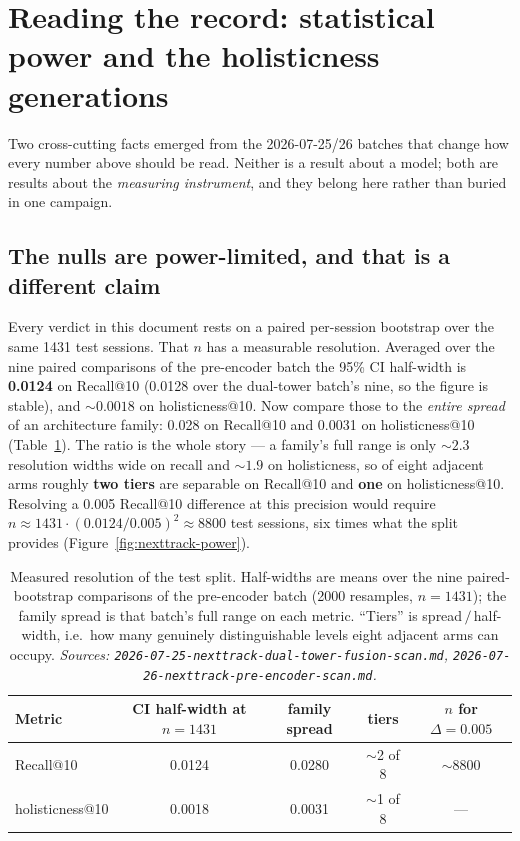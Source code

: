 \documentclass[11pt]{article}
\begin{document}
\section{Reading the record: statistical power and the holisticness generations}
\label{sec:power}
Two cross-cutting facts emerged from the 2026-07-25/26 batches that change how
every number above should be read. Neither is a result about a model; both are
results about the \emph{measuring instrument}, and they belong here rather than
buried in one campaign.

\subsection{The nulls are power-limited, and that is a different claim}
\label{sec:power-stats}
Every verdict in this document rests on a paired per-session bootstrap over the
same \num{1431} test sessions. That $n$ has a measurable resolution. Averaged
over the nine paired comparisons of the pre-encoder batch the 95\% CI half-width
is \textbf{\num{0.0124}} on Recall@10 (\num{0.0128} over the dual-tower batch's
nine, so the figure is stable), and \textbf{${\sim}\num{0.0018}$} on
holisticness@10. Now compare those to the \emph{entire spread} of an architecture
family: \num{0.028} on Recall@10 and \num{0.0031} on holisticness@10
(Table~\ref{tab:power}). The ratio is the whole story --- a family's full range
is only ${\sim}2.3$ resolution widths wide on recall and ${\sim}1.9$ on
holisticness, so of eight adjacent arms roughly \textbf{two tiers} are separable
on Recall@10 and \textbf{one} on holisticness@10. Resolving a \num{0.005}
Recall@10 difference at this precision would require
$n \approx 1431\cdot(\num{0.0124}/\num{0.005})^2 \approx \num{8800}$ test
sessions, six times what the split provides
(Figure~\ref{fig:nexttrack-power}).

\begin{table}[ht]
  \centering
  \caption{Measured resolution of the test split. Half-widths are means over the
  nine paired-bootstrap comparisons of the pre-encoder batch (\num{2000}
  resamples, $n=\num{1431}$); the family spread is that batch's full range on
  each metric. ``Tiers'' is spread\,$/$\,half-width, i.e.\ how many genuinely
  distinguishable levels eight adjacent arms can occupy.
  \emph{Sources: \texttt{2026-07-25-nexttrack-dual-tower-fusion-scan.md},
  \texttt{2026-07-26-nexttrack-pre-encoder-scan.md}.}}
  \label{tab:power}
  {\footnotesize\setlength{\tabcolsep}{6pt}\begin{tabular}{lcccc}
    \toprule
    Metric & CI half-width at $n=\num{1431}$ & family spread & tiers & $n$ for $\Delta=\num{0.005}$ \\
    \midrule
    Recall@10 & 0.0124 & 0.0280 & $\sim$2 of 8 & $\sim$\num{8800} \\
    holisticness@10 & 0.0018 & 0.0031 & $\sim$1 of 8 & --- \\
    \bottomrule
  \end{tabular}}
\end{table}
\end{document}
